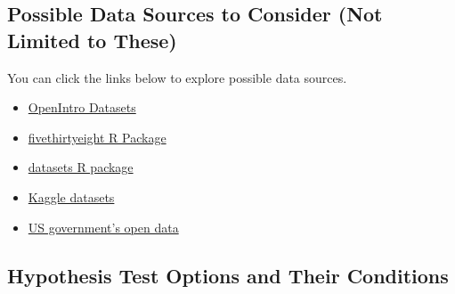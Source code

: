 \documentclass[12pt]{article}
\begin{document}
\subsection*{Possible Data Sources to Consider (Not Limited to These)}
You can click the links below to explore possible data sources.
\begin{itemize}
    \item \href{https://www.openintro.org/data/}{OpenIntro Datasets}
    \item \href{https://cran.r-project.org/web/packages/fivethirtyeight/vignettes/fivethirtyeight.html}{fivethirtyeight R Package}
    \item \href{https://stat.ethz.ch/R-manual/R-devel/library/datasets/html/00Index.html}{datasets R package}
    \item \href{https://www.kaggle.com/datasets}{Kaggle datasets}
    \item \href{https://data.gov/}{US government's open data}
\end{itemize}

\subsection*{Hypothesis Test Options and Their Conditions}

\end{document}
